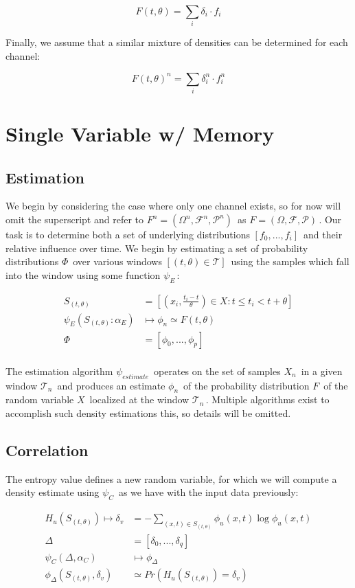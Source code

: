 \documentclass[10pt]{article}
\begin{document}
\[ F(t,\theta) = \sum_i \delta_i \cdot f_i \]

Finally, we assume that a similar mixture of densities can be determined for each channel:

\[ F(t,\theta)^n = \sum_i \delta_i^n \cdot f_i^n \]

\section{Single Variable w/ Memory}
\subsection{Estimation}
We begin by considering the case where only one channel exists, so for now will omit the superscript and refer to \(F^n = (\Omega^n,\mathcal{F}^n,\mathcal{P}^n) \,\!\) as \(F = (\Omega, \mathcal{F},\mathcal{P}) \,\!\).  Our task is to determine both a set of underlying distributions \([f_0,...,f_i] \,\!\) and their relative influence over time.  We begin by estimating a set of probability distributions \(\Phi \,\!\) over various windows \([(t,\theta) \in \mathcal{T} ] \,\!\) using the samples which fall into the window using some function \(\psi_E \,\!\):

\begin{align*}
S_{(t,\theta)} &= [ (x_i,\frac{t_i - t}{\theta}) \in X : t \le t_i < t+\theta ] \\
\psi_E( S_{(t,\theta)}:\alpha_E ) &\mapsto \phi_n \simeq F(t,\theta)  \\
\Phi &= [\phi_0,...,\phi_p ] \\
\end{align*} 

The estimation algorithm \(\psi_{estimate} \,\!\) operates on the set of samples \(X_n \,\!\) in a given window \(\mathcal{T}_n \,\!\) and produces an estimate \(\phi_n \,\!\) of the probability distribution \(F \,\!\) of the random variable \(X \,\!\) localized at the window \(\mathcal{T}_n \,\!\).  Multiple algorithms exist to accomplish such density estimations this, so details will be omitted.

\subsection{Correlation}
The entropy value defines a new random variable, for which we will compute a density estimate using \(\psi_C \,\!\) as we have with the input data previously:

\begin{align*}
H_u( S_{(t,\theta)} ) \mapsto \delta_v &= -\sum_{(x,t) \in S_{(t,\theta)}} \phi_u(x,t) \log \phi_u(x,t) \\
\Delta &= [\delta_0,...,\delta_q] \\
\psi_C( \Delta , \alpha_C ) &\mapsto \phi_\Delta \\
\phi_\Delta(S_{(t,\theta)},\delta_v) &\simeq Pr( H_u(S_{(t,\theta)}) = \delta_v ) \\
\end{align*}
\end{document}
